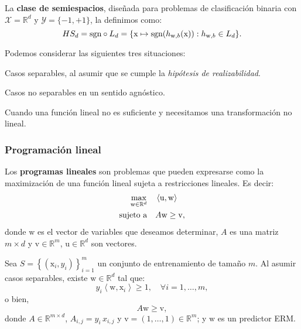 \documentclass[8pt,a4paper]{extarticle}
\begin{document}
\begin{multicols}{3}
	\begin{boxdef}
		La \textbf{clase de semiespacios}, diseñada para problemas de clasificación binaria con $\mathcal{X} = \mathbb{R}^d$ y $\mathcal{Y} = \{-1, +1\} $, la definimos como:
		\[
			HS_d = \text{\normalfont sgn} \circ L_{d} = \{\mathrm{x} \mapsto \text{\normalfont sgn}(h_{\mathrm{w}, b} (\mathrm{x})) : h_{\mathrm{w}, b} \in L_d\}
			.\]
	\end{boxdef}

	Podemos considerar las siguientes tres situaciones:

	\begin{numberlist}
		\item Casos separables, al asumir que se cumple la \emph{hipótesis de realizabilidad}.
		\item Casos no separables en un sentido agnóstico.
		\item[\textcolor{dred}{3.}] Cuando una función lineal no es suficiente y necesitamos una transformación no lineal.
	\end{numberlist}

	\subsubsection{Programación lineal}

	\begin{boxdef}
		Los \textbf{programas lineales} son problemas que pueden expresarse como la maximización de una función lineal sujeta a restricciones lineales. Es decir:
		\begin{align*}
			\max_{\mathrm{w} \in \mathbb{R}^d} \quad & \left<\mathrm{u}, \mathrm{w} \right> \\
			\text{\normalfont sujeto a} \quad        & A\mathrm{w} \ge \mathrm{v}
			,\end{align*}
		donde $ \mathrm{w}$ es el vector de variables que deseamos determinar, $A$ es una matriz  $m \times d$ y $ \mathrm{v} \in \mathbb{R}^m$, $ \mathrm{u} \in \mathbb{R}^d$ son vectores.
	\end{boxdef}

	\begin{boxprop}[]
		Sea $\displaystyle S = \left\{ \left( \mathrm{x}_i, y_i \right)  \right\}_{i = 1}^m $ un conjunto de entrenamiento de tamaño $m$. Al asumir casos separables, existe  $ \mathrm{w} \in \mathbb{R}^d$ tal que:
		\[
			y_i \left< \mathrm{w}, \mathrm{x}_i \right> \ge 1, \quad \forall i = 1, \ldots, m
			,\]
		o bien,
		\[
			A\mathrm{w} \ge \mathrm{v}
			,\]
		donde $A \in \mathbb{R}^{m \times d}$, $A_{i,j} = y_i\, x_{i,j}$ y $ \mathrm{v} = (1, \ldots, 1) \in \mathbb{R}^m$; y $ \mathrm{w}$ es un predictor ERM.
	\end{boxprop}


\end{multicols}
\end{document}
